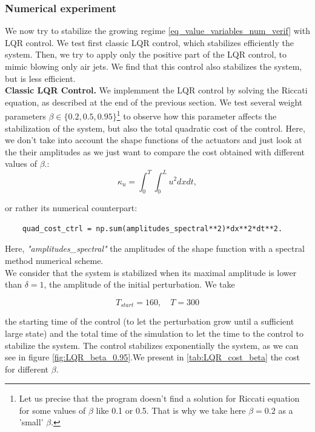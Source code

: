 \documentclass[12pt]{article}
\begin{document}
 
\subsubsection{Numerical experiment}
We now try to stabilize the growing regime \eqref{eq_value_variables_num_verif} with LQR
control. We test first classic LQR control, which stabilizes efficiently the system. Then,
we try to apply only the positive part of the LQR control, to mimic blowing only air jets.
We find that this control also stabilizes the system, but is less efficient. 
\\

\textbf{Classic LQR Control.} We implemment the LQR control by solving the Riccati equation, 
as described at the end of the previous section. We test several weight parameters $\beta
\in \{0.2, 0.5, 0.95 \}$\footnote{Let us precise that the program doesn't find a solution for
Riccati equation for some values of $\beta$ like 0.1 or 0.5. That is why we take here $\beta=0.2$
as a 'small' $\beta$.} to observe how this parameter affects the stabilization of the system,
but also the total quadratic cost of the control. Here, we don't take into account the shape functions
 of the actuators and just look at the their amplitudes as we just want to compare the cost obtained 
 with different values of $\beta$.: 
\begin{equation}
    \kappa_u = \int_{0}^{T} \int_{0}^{L}u^2 dx dt,
\end{equation}

or rather its numerical counterpart:

\begin{verbatim}
    quad_cost_ctrl = np.sum(amplitudes_spectral**2)*dx**2*dt**2.
\end{verbatim}

Here, \textit{"amplitudes\_spectral"} the amplitudes of the shape function with a spectral method 
numerical scheme.  
\\

We consider that the system is stabilized when its maximal amplitude is lower than $\delta=1$, the 
amplitude of the initial perturbation. We take 


\begin{equation}
    T_{start} = 160, \quad T=300
\end{equation}

the starting time of the control (to let the perturbation grow until a sufficient large state) and
the total time of the simulation to let the time to the control to stabilize the system.
The control stabilizes exponentially the system, as we can see in figure \eqref{fig:LQR_beta_0.95}.We 
present in \eqref{tab:LQR_cost_beta} the cost for different $\beta$.
\end{document}
